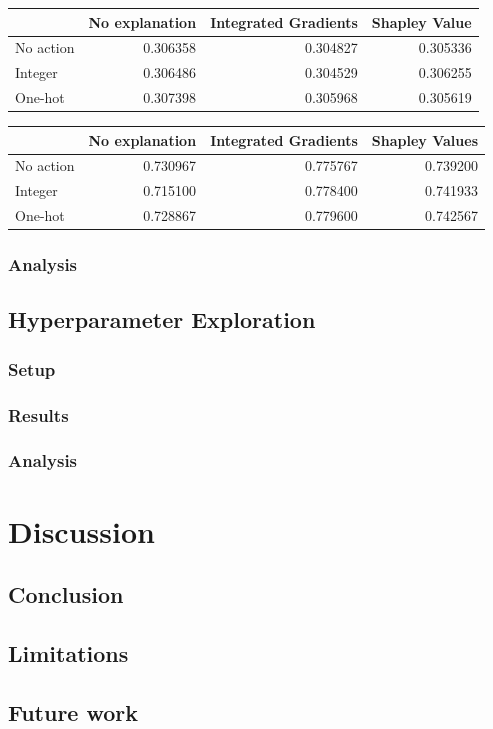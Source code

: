 \documentclass[UKenglish]{uiomasterthesis}
\begin{document}
\begin{center}
\label{tab:state_simpl_lstm}
\begin{tabular}{lrrr}
\toprule
 & No explanation & Integrated Gradients & Shapley Value \\
\midrule
No action & 0.306358 & 0.304827 & 0.305336 \\
Integer & 0.306486 & 0.304529 & 0.306255 \\
One-hot & 0.307398 & 0.305968 & 0.305619 \\
\bottomrule
\end{tabular}
\end{center}

\begin{center}
\label{tab:event_simpl_lstm}
\begin{tabular}{lrrr}
\toprule
 & No explanation & Integrated Gradients & Shapley Values \\
\midrule
No action & 0.730967 & 0.775767 & 0.739200 \\
Integer & 0.715100 & 0.778400 & 0.741933 \\
One-hot & 0.728867 & 0.779600 & 0.742567 \\
\bottomrule
\end{tabular}
\end{center}

\subsection{Analysis}

\section{Hyperparameter Exploration}
\label{sec:exp_3}

\subsection{Setup}
\subsection{Results}
\subsection{Analysis}

\chapter{Discussion}

\section{Conclusion}

\section{Limitations}

\section{Future work}


\printbibliography{}
\end{document}
